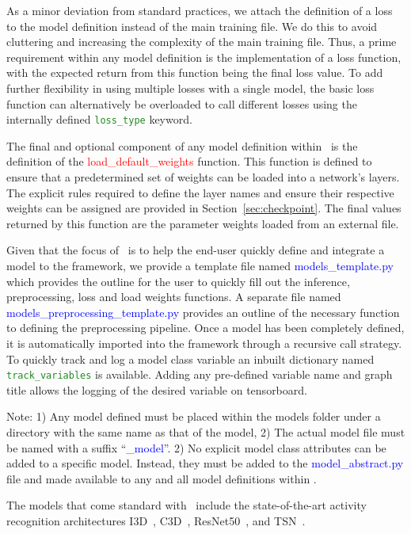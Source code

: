 \documentclass{llncs}
\begin{document}
As a minor deviation from standard practices, we attach the definition of a loss to the model definition instead of the main training file.
We do this to avoid cluttering and increasing the complexity of the main training file.
Thus, a prime requirement within any model definition is the implementation of a loss function, with the expected return from this function being the final loss value.
To add further flexibility in using multiple losses with a single model, the basic loss function can alternatively be overloaded to call different losses using the internally defined \texttt{\textcolor{ForestGreen}{loss\_type}} keyword.

The final and optional component of any model definition within \acro~is the definition of the \textcolor{red}{load\_default\_weights} function.
This function is defined to ensure that a predetermined set of weights can be loaded into a network's layers.
The explicit rules required to define the layer names and ensure their respective weights can be assigned are provided in Section~\ref{sec:checkpoint}.
The final values returned by this function are the parameter weights loaded from an external file. 

Given that the focus of \acro~is to help the end-user quickly define and integrate a model to the framework, we provide a template file named \textcolor{blue}{models\_template.py} which provides the outline for the user to quickly fill out the inference, preprocessing, loss and load weights functions.
A separate file named \textcolor{blue}{models\_preprocessing\_template.py} provides an outline of the necessary function to defining the preprocessing pipeline.
Once a model has been completely defined, it is automatically imported into the framework through a recursive call strategy.
To quickly track and log a model class variable an inbuilt dictionary named \texttt{\textcolor{ForestGreen}{track\_variables}} is available.
Adding any pre-defined variable name and graph title allows the logging of the desired variable on tensorboard.

Note: 1) Any model defined must be placed within the models folder under a directory with the same name as that of the model,
2) The actual model file must be named with a suffix ``\textcolor{blue}{\_model}''.
2) No explicit model class attributes can be added to a specific model. Instead, they must be added to the \textcolor{blue}{model\_abstract.py} file and made available to any and all model definitions within \acro.

The models that come standard with \acro~include the state-of-the-art activity recognition architectures I3D~\cite{}, C3D~\cite{}, ResNet50~\cite{}, and TSN~\cite{}.
\end{document}
